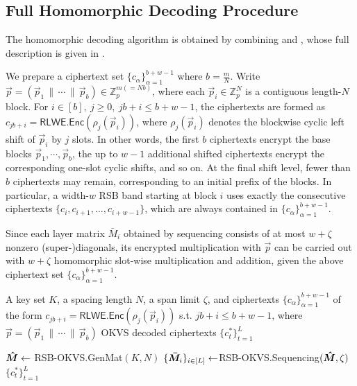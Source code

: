 \subsection{Full Homomorphic Decoding Procedure}\label{subsec:okvsdecoding}
The homomorphic decoding algorithm is obtained by combining  and , whose full description is given in . 

We prepare a ciphertext set \(\{c_\alpha\}_{\alpha=1}^{b+w-1}\) where $b=\frac{m}{N}$.
Write $\vec p=(\vec p_1 \,\|\, \cdots \,\|\, \vec p_b)\in\mathbb Z_p^{m(=Nb)}$, where each \(\vec p_i\in\mathbb Z_p^N\) is a contiguous length-\(N\) block.
For $ i\in[b],\ j\ge 0,\ jb+i\le b+w-1$, the ciphertexts are formed as
$c_{jb+i}=\mathsf{RLWE.Enc}(\rho_j(\vec p_i))$,
where \(\rho_j(\vec p_i)\) denotes the blockwise cyclic left shift of \(\vec p_i\) by \(j\) slots. 
In other words, the first \(b\) ciphertexts encrypt the base blocks \(\vec p_1,\cdots,\vec p_b\), the up to \(w-1\) additional shifted ciphertexts encrypt the corresponding one-slot cyclic shifts, and so on. At the final shift level, fewer than $b$ ciphertexts may remain, corresponding to an initial prefix of the blocks. In particular, a width-\(w\) RSB band starting at block \(i\) uses exactly the consecutive ciphertexts $\{c_i,c_{i+1},\dots,c_{i+w-1}\}$, which are always contained in \(\{c_\alpha\}_{\alpha=1}^{b+w-1}\).

Since each layer matrix $\bar M_i$ obtained by sequencing consists of at most $w + \zeta$ nonzero (super-)diagonals, its encrypted multiplication with $\vec p$ can be carried out with $w + \zeta$ homomorphic slot-wise multiplication and addition, given the above ciphertext set \(\{c_\alpha\}_{\alpha=1}^{b+w-1}\).

\begin{algorithm}[h]
\caption{\textsf{RSB-OKVS.HomDecode}}
\label{alg:RSBDecoding}
\begin{algorithmic}[1]
\Input A key set \(K\), a spacing length $N$, a span limit $\zeta$, and ciphertexts 
$\{c_\alpha\}_{\alpha=1}^{b+w-1}$ of the form $c_{jb+i}=\mathsf{RLWE.Enc}(\rho_j(\vec p_i))$ s.t. $jb+i\le b+w-1$, where $\vec p=(\vec p_1 \,\|\, \cdots \,\|\, \vec p_b)$
\Output OKVS decoded ciphertexts \(\{{c}^*_t\}_{t=1}^{L}\)

\State $\bm{\hat{M}} \leftarrow$ \textsf{RSB-OKVS.GenMat}$(K,N)$
\State $\{\bm{\bar M}_i\}_{i\in [L]}\leftarrow$\textsf{RSB-OKVS.Sequencing}$(\bm{\hat{M}}, \zeta)$ 
\EndFor
\State \Return $\{ c_t^*\}_{t=1}^{L}$
\end{algorithmic}
\end{algorithm}

